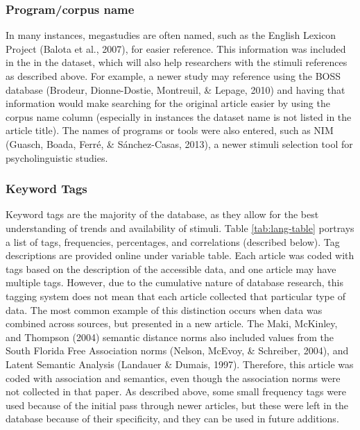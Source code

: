 \documentclass[english,man]{apa6}
\theoremstyle{definition}
\theoremstyle{definition}
\theoremstyle{definition}
\theoremstyle{remark}
\begin{document}
\subsubsection{Program/corpus name}\label{programcorpus-name}

In many instances, megastudies are often named, such as the English
Lexicon Project (Balota et al., 2007), for easier reference. This
information was included in the in the dataset, which will also help
researchers with the stimuli references as described above. For example,
a newer study may reference using the BOSS database (Brodeur,
Dionne-Dostie, Montreuil, \& Lepage, 2010) and having that information
would make searching for the original article easier by using the corpus
name column (especially in instances the dataset name is not listed in
the article title). The names of programs or tools were also entered,
such as NIM (Guasch, Boada, Ferré, \& Sánchez-Casas, 2013), a newer
stimuli selection tool for psycholinguistic studies.

\subsubsection{Keyword Tags}\label{keyword-tags}

Keyword tags are the majority of the database, as they allow for the
best understanding of trends and availability of stimuli. Table
\ref{tab:lang-table} portrays a list of tags, frequencies, percentages,
and correlations (described below). Tag descriptions are provided online
under variable table. Each article was coded with tags based on the
description of the accessible data, and one article may have multiple
tags. However, due to the cumulative nature of database research, this
tagging system does not mean that each article collected that particular
type of data. The most common example of this distinction occurs when
data was combined across sources, but presented in a new article. The
Maki, McKinley, and Thompson (2004) semantic distance norms also
included values from the South Florida Free Association norms (Nelson,
McEvoy, \& Schreiber, 2004), and Latent Semantic Analysis (Landauer \&
Dumais, 1997). Therefore, this article was coded with association and
semantics, even though the association norms were not collected in that
paper. As described above, some small frequency tags were used because
of the initial pass through newer articles, but these were left in the
database because of their specificity, and they can be used in future
additions.
\end{document}
